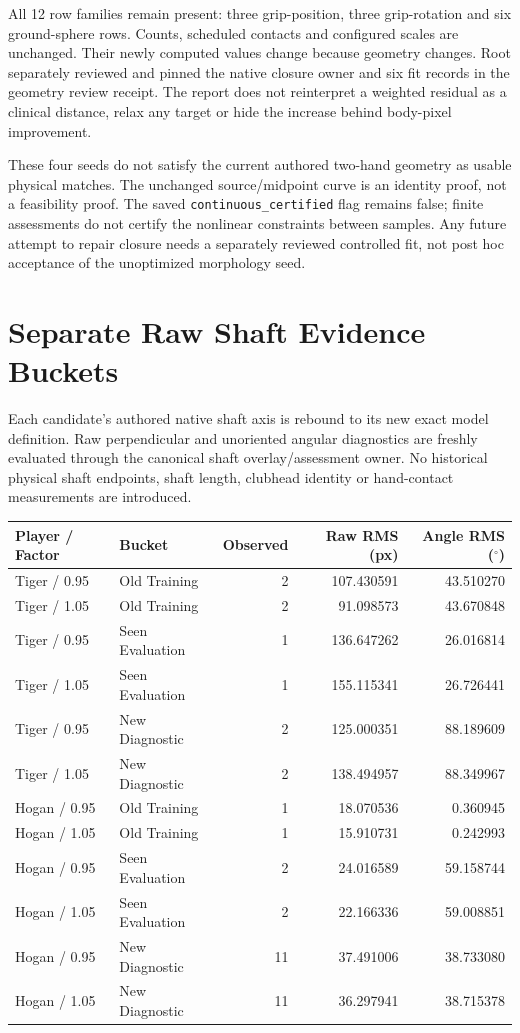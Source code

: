 \documentclass[11pt,letterpaper]{article}
\newcommand{\code}[1]{\nolinkurl{#1}}\newcommand{\hash}[1]{{\footnotesize\nolinkurl{#1}}}
\newcommand{\chapterpage}[1]{\clearpage\section{#1}}
\begin{document}
All 12 row families remain present: three grip-position, three grip-rotation and six ground-sphere rows. Counts, scheduled contacts and configured scales are unchanged. Their newly computed values change because geometry changes. Root separately reviewed and pinned the native closure owner and six fit records in the geometry review receipt. The report does not reinterpret a weighted residual as a clinical distance, relax any target or hide the increase behind body-pixel improvement.

These four seeds do not satisfy the current authored two-hand geometry as usable physical matches. The unchanged source/midpoint curve is an identity proof, not a feasibility proof. The saved \code{continuous_certified} flag remains false; finite assessments do not certify the nonlinear constraints between samples. Any future attempt to repair closure needs a separately reviewed controlled fit, not post hoc acceptance of the unoptimized morphology seed.

\chapterpage{Separate Raw Shaft Evidence Buckets}
Each candidate's authored native shaft axis is rebound to its new exact model definition. Raw perpendicular and unoriented angular diagnostics are freshly evaluated through the canonical shaft overlay/assessment owner. No historical physical shaft endpoints, shaft length, clubhead identity or hand-contact measurements are introduced.

\begin{tabular}{@{}llrrr@{}}\toprule
Player / Factor & Bucket & Observed & Raw RMS (px) & Angle RMS ($^\circ$)\\\midrule
Tiger / 0.95 & Old Training & 2 & 107.430591 & 43.510270\\
Tiger / 1.05 & Old Training & 2 & 91.098573 & 43.670848\\
Tiger / 0.95 & Seen Evaluation & 1 & 136.647262 & 26.016814\\
Tiger / 1.05 & Seen Evaluation & 1 & 155.115341 & 26.726441\\
Tiger / 0.95 & New Diagnostic & 2 & 125.000351 & 88.189609\\
Tiger / 1.05 & New Diagnostic & 2 & 138.494957 & 88.349967\\\midrule
Hogan / 0.95 & Old Training & 1 & 18.070536 & 0.360945\\
Hogan / 1.05 & Old Training & 1 & 15.910731 & 0.242993\\
Hogan / 0.95 & Seen Evaluation & 2 & 24.016589 & 59.158744\\
Hogan / 1.05 & Seen Evaluation & 2 & 22.166336 & 59.008851\\
Hogan / 0.95 & New Diagnostic & 11 & 37.491006 & 38.733080\\
Hogan / 1.05 & New Diagnostic & 11 & 36.297941 & 38.715378\\\bottomrule
\end{tabular}
\end{document}
